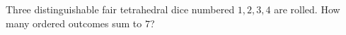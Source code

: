 Three distinguishable fair tetrahedral dice numbered $1,2,3,4$ are rolled. How many ordered outcomes sum to $7$?
